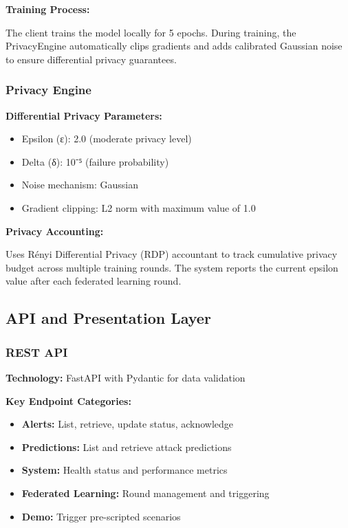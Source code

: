 \documentclass[12pt,a4paper]{article}
\begin{document}
\textbf{Training Process:}

The client trains the model locally for 5 epochs. During training, the PrivacyEngine automatically clips gradients and adds calibrated Gaussian noise to ensure differential privacy guarantees.

\subsubsection{Privacy Engine}

\textbf{Differential Privacy Parameters:}
\begin{itemize}[leftmargin=1cm,itemsep=0pt]
    \item Epsilon (ε): 2.0 (moderate privacy level)
    \item Delta (δ): 10⁻⁵ (failure probability)
    \item Noise mechanism: Gaussian
    \item Gradient clipping: L2 norm with maximum value of 1.0
\end{itemize}

\textbf{Privacy Accounting:}

Uses Rényi Differential Privacy (RDP) accountant to track cumulative privacy budget across multiple training rounds. The system reports the current epsilon value after each federated learning round.

\subsection{API and Presentation Layer}

\subsubsection{REST API}

\textbf{Technology:} FastAPI with Pydantic for data validation

\textbf{Key Endpoint Categories:}
\begin{itemize}[leftmargin=1cm,itemsep=0pt]
    \item \textbf{Alerts:} List, retrieve, update status, acknowledge
    \item \textbf{Predictions:} List and retrieve attack predictions
    \item \textbf{System:} Health status and performance metrics
    \item \textbf{Federated Learning:} Round management and triggering
    \item \textbf{Demo:} Trigger pre-scripted scenarios
\end{itemize}
\end{document}
